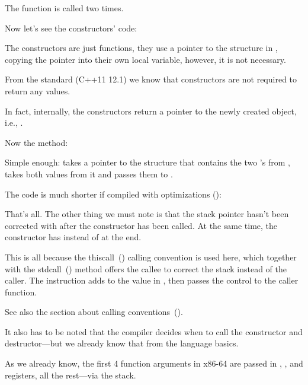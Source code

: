 The  function is called two times.

Now let's see the constructors' code:



The constructors are just functions, they use a pointer to the structure in \ECX,
copying the pointer into their own local variable, however, it is not necessary.

From the \Cpp standard (C++11 12.1) we know that constructors are not required to return any values.

In fact, internally, the constructors return a pointer to the newly created object, i.e., \ITthis.

Now the  method:



Simple enough:  takes a pointer to the structure that contains the two \Tint's from \ECX,
takes both values from it and passes them to \printf.

The code is much shorter if compiled with optimizations (\Ox):




That's all. The other thing we must note is that the \gls{stack pointer} hasn't been corrected
with  after the constructor has been called. 
At the same time, the constructor has  instead of \RET at the end.


This is all because the thiscall~() calling convention is used here,
which together with the stdcall~() method offers the \gls{callee} to correct the stack
instead of the \gls{caller}.
The  instruction adds  to the value in \ESP, then passes the control to the \gls{caller} function.

See also the section about calling conventions~().

It also has to be noted that the compiler decides when to call the constructor and 
destructor---but we already know that from the \Cpp language basics.

\label{simple_CPP_MSVC_x64}

As we already know, the first 4 function arguments in x86-64 are passed in \RCX, \RDX,  and 
 registers, all the rest---via the stack.

